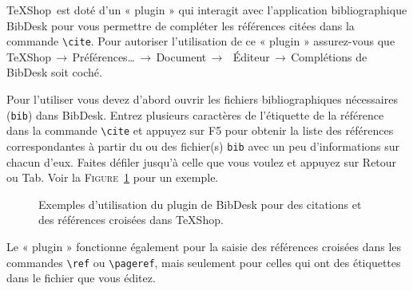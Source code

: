 \documentclass[11pt,french]{article}
\newcommand{\TS}{\textsf{\TeX Shop}}
\newcommand{\cmd}[1]{\textsf{#1}}
\newcommand{\mnu}[1]{\textsf{#1}}
\newcommand{\To}{\,\(\to\)\,}
\begin{document}
\TS\ est doté d'un « plugin » qui interagit avec l'application bibliographique \cmd{BibDesk} pour vous permettre de compléter les références citées dans la commande \verb|\cite|. Pour autoriser l'utilisation de ce « plugin » assurez-vous que \mnu{TeXShop}\To\mnu{Préférences…}\To\mnu{Document}\To\ \mnu{Éditeur}\To\mnu{Complétions de BibDesk} soit coché.

Pour l'utiliser vous devez d'abord ouvrir les fichiers bibliographiques nécessaires (\texttt{bib}) dans \cmd{BibDesk}. Entrez plusieurs caractères de l'étiquette de la référence dans la commande \verb|\cite| et appuyez sur \cmd{F5} pour obtenir la liste des références correspondantes à partir du ou des fichier(s) \texttt{bib} avec un peu d'informations sur chacun d'eux. Faites défiler jusqu'à celle que vous voulez et appuyez sur \cmd{Retour} ou \cmd{Tab}. Voir la \textsc{Figure}~\ref{fig:bibdesk} pour un exemple.


\begin{figure}
\centering
{}\qquad{}
\caption{Exemples d'utilisation du plugin de \textsf{BibDesk} pour des citations et des références croisées dans \TS.} 
\label{fig:bibdesk}
\end{figure}
Le « plugin » fonctionne également pour la saisie des références croisées dans les commandes \verb|\ref| ou \verb|\pageref|, mais seulement pour celles qui ont des étiquettes dans le fichier que vous éditez.
\end{document}
